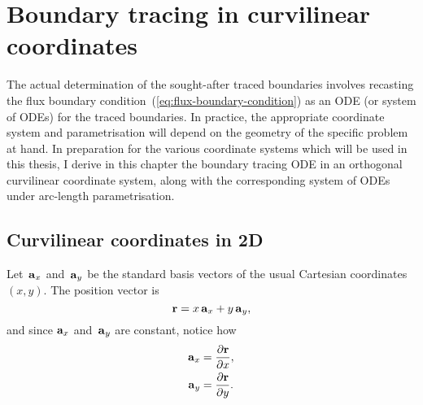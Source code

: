 \chapter{Boundary tracing in curvilinear coordinates}

The actual determination of the sought-after traced boundaries involves
recasting the flux boundary condition~(\ref{eq:flux-boundary-condition})
as an ODE (or system of ODEs) for the traced boundaries.
In practice, the appropriate coordinate system and parametrisation
will depend on the geometry of the specific problem at hand.
In preparation for the various coordinate systems
which will be used in this thesis,
I derive in this chapter the boundary tracing ODE
in an orthogonal curvilinear coordinate system,
along with the corresponding system of ODEs
under arc-length parametrisation.

\section{Curvilinear coordinates in 2D}

Let~$\mathop{}\!\boldsymbol{\mathrm{a}}_{x}$ and~$\mathop{}\!\boldsymbol{\mathrm{a}}_{y}$ be the standard basis vectors
of the usual Cartesian coordinates~$(x, y)$.
The position vector is
\begin{equation}
  \boldsymbol{\mathrm{r}} = x \mathop{}\!\boldsymbol{\mathrm{a}}_{x} + y \mathop{}\!\boldsymbol{\mathrm{a}}_{y},
\end{equation}
and since $\mathop{}\!\boldsymbol{\mathrm{a}}_{x}$ and~$\mathop{}\!\boldsymbol{\mathrm{a}}_{y}$ are constant,
notice how
\begin{align}
  \mathop{}\!\boldsymbol{\mathrm{a}}_{x} &= \frac{\mathop{}\!\partial \boldsymbol{\mathrm{r}}}{\mathop{}\!\partial x}, \\
  \mathop{}\!\boldsymbol{\mathrm{a}}_{y} &= \frac{\mathop{}\!\partial \boldsymbol{\mathrm{r}}}{\mathop{}\!\partial y}.
\end{align}
